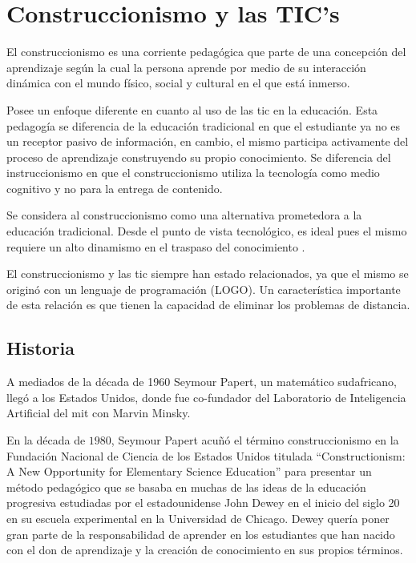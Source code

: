 \section{Construccionismo y las TIC's}
\label{sec:tics_CONSTRUCCIONISMO}

El construccionismo es una corriente pedagógica que parte de una concepción del
aprendizaje según la cual la persona aprende por medio de su interacción
dinámica con el mundo físico, social y cultural en el que está
inmerso\cite{valdivia:sg}.

Posee un enfoque diferente en cuanto al uso de las \Gls{tic} en la educación.
Esta pedagogía se diferencia de la educación tradicional en que el estudiante ya
no es un receptor pasivo de información, en cambio, el mismo participa
activamente del proceso de aprendizaje construyendo su propio conocimiento. Se
diferencia del instruccionismo en que el construccionismo utiliza la tecnología
como medio cognitivo y no para la entrega de contenido.

Se considera al construccionismo como una alternativa prometedora a la educación
tradicional. Desde el punto de vista tecnológico, es ideal pues el mismo
requiere un alto dinamismo en el traspaso del conocimiento
\cite{sasha:construtivism}. 

El construccionismo y las \Gls{tic} siempre han estado relacionados, ya que el
mismo se originó con un lenguaje de programación (LOGO)\cite{ict:ttc}. Un
característica importante de esta relación es que tienen la capacidad de
eliminar los problemas de distancia\cite{mariluz:seiousgames}.


\subsection{Historia}

A mediados de la década de 1960 Seymour Papert, un matemático sudafricano, llegó
a los Estados Unidos, donde fue co-fundador del Laboratorio de Inteligencia
Artificial del \Gls{mit} con Marvin Minsky\cite{logo:sg}. 


En la década de $1980$, Seymour Papert acuñó el término construccionismo en la
Fundación Nacional de Ciencia de los Estados Unidos titulada
\enquote{Constructionism: A New Opportunity for Elementary Science Education}
para presentar un método pedagógico que se basaba en muchas de las ideas de la
educación progresiva estudiadas por el estadounidense John Dewey en el inicio
del siglo 20 en su escuela experimental en la Universidad de Chicago. Dewey
quería poner gran parte de la responsabilidad de aprender en los estudiantes que
han nacido con el don de aprendizaje y la creación de conocimiento en sus
propios términos\cite{historia:2014}.

